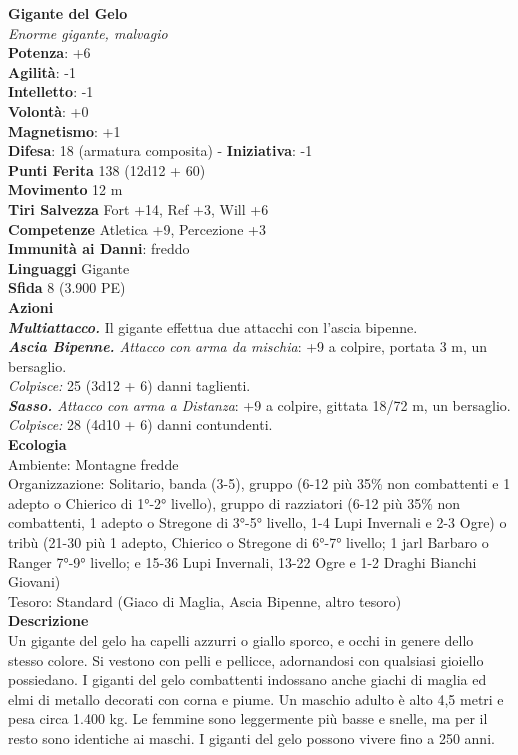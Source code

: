 \begin{multicols}{2}
\medskip\textbf{Gigante del Gelo}\\
\emph{Enorme gigante, malvagio}\\
\textbf{Potenza}: +6\\
\textbf{Agilità}: -1\\
\textbf{Intelletto}: -1\\
\textbf{Volontà}: +0\\
\textbf{Magnetismo}: +1\\
\textbf{Difesa}: 18 (armatura composita) - \textbf{Iniziativa}: -1\\
\textbf{Punti Ferita} 138 (12d12 + 60)\\
\textbf{Movimento} 12 m\\
\textbf{Tiri Salvezza} Fort +14, Ref +3, Will +6\\
\textbf{Competenze} Atletica +9, Percezione +3\\
\textbf{Immunità ai Danni}: freddo\\
\textbf{Linguaggi} Gigante\\
\textbf{Sfida} 8 (3.900 PE)\smallskip\\
\smallskip\textbf{Azioni}\\
\emph{\textbf{Multiattacco.}} Il gigante effettua due attacchi con l'ascia bipenne.\\
\emph{\textbf{Ascia Bipenne.} Attacco con arma da mischia}: +9 a colpire, portata 3 m, un bersaglio.\\
\emph{Colpisce:} 25 (3d12 + 6) danni taglienti.\\
\emph{\textbf{Sasso.} Attacco con arma a Distanza}: +9 a colpire, gittata 18/72 m, un bersaglio.\\
\emph{Colpisce:} 28 (4d10 + 6) danni contundenti.\\
\textbf{Ecologia}\\
Ambiente: Montagne fredde\\
Organizzazione: Solitario, banda (3-5), gruppo (6-12 più 35\% non combattenti e 1 adepto o Chierico di 1°-2° livello), gruppo di razziatori (6-12 più 35\% non combattenti, 1 adepto o Stregone di 3°-5° livello, 1-4 Lupi Invernali e 2-3 Ogre) o tribù (21-30 più 1 adepto, Chierico o Stregone di 6°-7° livello; 1 jarl Barbaro o Ranger 7°-9° livello; e 15-36 Lupi Invernali, 13-22 Ogre e 1-2 Draghi Bianchi Giovani)\\
Tesoro: Standard (Giaco di Maglia, Ascia Bipenne, altro tesoro)\\
\textbf{Descrizione}\\
Un gigante del gelo ha capelli azzurri o giallo sporco, e occhi in genere dello stesso colore. Si vestono con pelli e pellicce, adornandosi con qualsiasi gioiello possiedano. I giganti del gelo combattenti indossano anche giachi di maglia ed elmi di metallo decorati con corna e piume. Un maschio adulto è alto 4,5 metri e pesa circa 1.400 kg. Le femmine sono leggermente più basse e snelle, ma per il resto sono identiche ai maschi. I giganti del gelo possono vivere fino a 250 anni.\\


\end{multicols}
